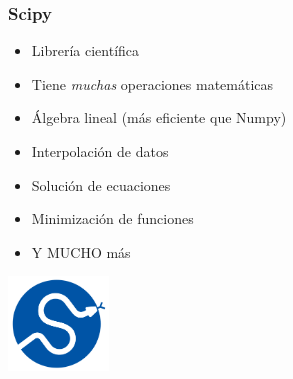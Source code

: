 \documentclass[14pt,aspectratio=169,xcolor=dvipsnames]{beamer}
\begin{document}
\begin{frame}\frametitle{}
\end{frame}
\begin{frame}\frametitle{Scipy}
    \begin{itemize}
        \item Librería científica
        \item Tiene \emph{muchas} operaciones matemáticas
        \item Álgebra lineal (más eficiente que Numpy)
        \item {\only<2>{\bf}Interpolación de datos}
        \item {Solución de ecuaciones}
        \item {Minimización de funciones}
        \item Y MUCHO más
    \end{itemize}

    \begin{flushright}
        \includegraphics[width=0.2\textwidth]{../images/logos/scipy.png}
    \end{flushright}
\end{frame}
\end{document}
